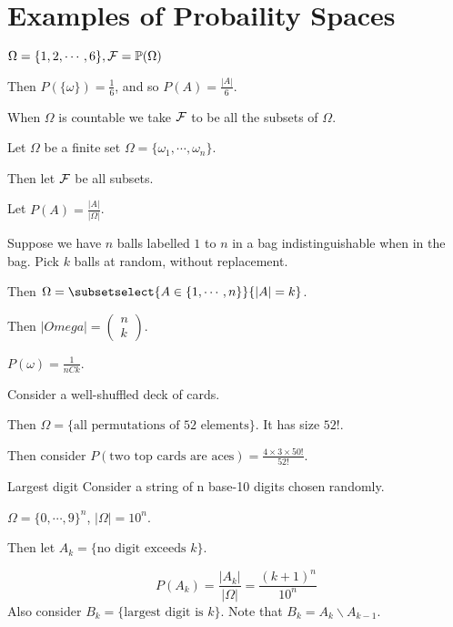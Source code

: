 \documentclass[../Main.tex]{subfiles}
\begin{document}
\section{Examples of Probaility Spaces}
\begin{example}
    $\Omega = \{1, 2, \cdots, 6\}, \mathcal{F} = \mathbb{P}(\Omega)$\par %
        Then $P(\{\omega\}) = \frac{1}{6}$, and so $P(A) = \frac{|A|}{6}$.
\end{example}
\begin{remark}
    When $\Omega$ is countable we take $\mathcal{F}$ to be all the subsets of $\Omega$.
\end{remark}
\begin{example}
    Let $\Omega$ be a finite set $\Omega = \{\omega_1, \cdots, \omega_n\}$.\par
    Then let $\mathcal{F}$ be all subsets.\par
    Let $P(A) = \frac{|A|}{|\Omega|}$.
\end{example}
\begin{example}
    Suppose we have $n$ balls labelled $1$ to $n$ in a bag indistinguishable when in the bag. Pick $k$ balls at random, without replacement.\par
    Then $\Omega = \subsetselect{A \in \{1, \cdots, n\}}{|A| = k}$.\par
    Then $|Omega| = \begin{pmatrix}n \\ k\end{pmatrix}$.\par
    $P(\omega) = \frac{1}{nCk}$.
\end{example}
\begin{example}
    Consider a well-shuffled deck of cards.\par
    Then $\Omega = \{\text{all permutations of 52 elements}\}$. It has size $52!$.\par
    Then consider $P(\text{two top cards are aces}) = \frac{4 \times 3 \times 50!}{52!}$.
\end{example}
\begin{example}{Largest digit}
    Consider a string of n base-10 digits chosen randomly.\par
    $\Omega = \{0, \cdots, 9\}^n$, $|\Omega| = 10^n$.\par
    Then let $A_k=\{\text{no digit exceeds } k\}$.\par
    \begin{equation*}
        P(A_k) = \frac{|A_k|}{|\Omega|} = \frac{(k + 1)^n}{10^n}
    \end{equation*}
    Also consider $B_k = \{\text{largest digit is } k\}$. Note that $B_k = A_k \backslash A_{k - 1}$.
\end{example}
\end{document}
